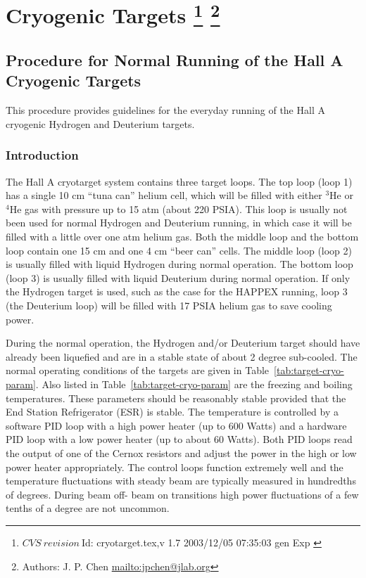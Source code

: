\chapter[Cryogenic Targets]{Cryogenic Targets
\footnote{
  $CVS~revision~ $Id: cryotarget.tex,v 1.7 2003/12/05 07:35:03 gen Exp $ $ }
\footnote{Authors: J. P. Chen \url{mailto:jpchen@jlab.org}}
}

\section{Procedure for Normal Running of the Hall A Cryogenic Targets}
This procedure provides guidelines for the everyday running of the Hall A
cryogenic Hydrogen and Deuterium targets.

\subsection{Introduction }
The Hall A cryotarget system contains three target loops. The top loop (loop 1)
has a single 10 cm ``tuna can'' helium cell, which will be filled with either 
$^3$He or $^4$He gas with pressure up to 15 atm (about 220 PSIA). This loop 
is usually not been used for normal Hydrogen and Deuterium running, in which 
case it will be filled with a little over one atm helium gas. Both the middle 
loop and the bottom loop contain one 15 cm and one 4 cm  ``beer can'' cells.
The middle loop (loop 2) is usually filled with liquid Hydrogen during normal 
operation.
The bottom loop (loop 3) is usually filled with liquid Deuterium during normal
operation. If only the Hydrogen target is used, such as the case for   
the HAPPEX running, loop 3 (the Deuterium loop) 
will be filled with 17 PSIA helium gas to save cooling power.

\par
During the normal operation, the Hydrogen and/or Deuterium target should
have already been liquefied and are in a stable state of 
about 2 degree sub-cooled. 
The normal operating conditions of the targets are given in Table~\ref{tab:target-cryo-param}.
Also listed in Table~\ref{tab:target-cryo-param} are the freezing and boiling temperatures.
These parameters should be reasonably stable provided that the End Station
Refrigerator (ESR) is stable. The
temperature is controlled by a software PID loop with a high power heater (up
to 600 Watts) and a hardware PID loop with a low power heater (up to about 
60 Watts). Both PID loops read the output of one
of the Cernox resistors and adjust the power in the high or low power heater 
appropriately.
The control loops function extremely well and the temperature fluctuations with
steady beam are typically measured in hundredths of degrees. During beam off-
beam on transitions high power fluctuations of a few tenths of a degree are
not uncommon.

